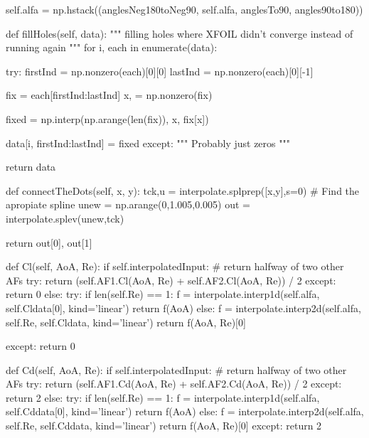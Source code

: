 \begin{pythoncode}
        self.alfa = np.hstack((anglesNeg180toNeg90, self.alfa, anglesTo90, angles90to180))


    def fillHoles(self, data):
        """ filling holes where XFOIL didn't converge instead of running again """
        for i, each in enumerate(data):

            try:
                firstInd = np.nonzero(each)[0][0]
                lastInd = np.nonzero(each)[0][-1]

                fix = each[firstInd:lastInd]
                x, = np.nonzero(fix)

                fixed = np.interp(np.arange(len(fix)), x, fix[x])

                data[i, firstInd:lastInd] = fixed
            except:
                """
                Probably just zeros
                """

        return data

    def connectTheDots(self, x, y):
        tck,u = interpolate.splprep([x,y],s=0) # Find the apropiate spline
        unew = np.arange(0,1.005,0.005)
        out = interpolate.splev(unew,tck)

        return out[0], out[1]
    
    def Cl(self, AoA, Re):
        if self.interpolatedInput: # return halfway of two other AFs
            try:
                return (self.AF1.Cl(AoA, Re) + self.AF2.Cl(AoA, Re)) / 2
            except:
                return 0
        else:
            try:
                if len(self.Re) == 1:
                    f = interpolate.interp1d(self.alfa, self.Cldata[0], kind='linear')
                    return f(AoA)
                else:
                    f = interpolate.interp2d(self.alfa, self.Re, self.Cldata, kind='linear')
                    return f(AoA, Re)[0]
                
            except:
                return 0

    def Cd(self, AoA, Re):
        if self.interpolatedInput: # return halfway of two other AFs
            try:
                return (self.AF1.Cd(AoA, Re) + self.AF2.Cd(AoA, Re)) / 2
            except:
                return 2
        else:
            try:
                if len(self.Re) == 1:
                    f = interpolate.interp1d(self.alfa, self.Cddata[0], kind='linear')
                    return f(AoA)
                else:
                    f = interpolate.interp2d(self.alfa, self.Re, self.Cddata, kind='linear')
                    return f(AoA, Re)[0]
            except:
                return 2


\end{pythoncode}
